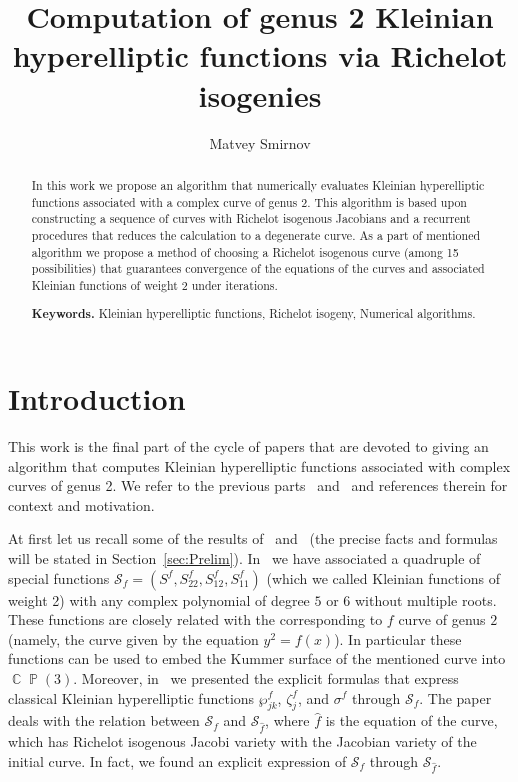 \documentclass{amsart}
\numberwithin{equation}{section}
\theoremstyle{definition}
\theoremstyle{remark}
\DeclareMathOperator{\CC}{\mathbb C}
\DeclareMathOperator{\PP}{\mathbb P}
\begin{document}
	\title[Computation of genus 2 Kleinian hyperelliptic functions]{Computation of genus 2 Kleinian hyperelliptic functions via Richelot isogenies}
	
	\author{Matvey Smirnov}
	\address{119991 Russia, Moscow GSP-1, ul. Gubkina 8,
		Institute for Numerical Mathematics,
		Russian Academy of Sciences}
	
	
	\begin{abstract}
		In this work we propose an algorithm that numerically evaluates Kleinian hyperelliptic functions associated with a complex curve of genus 2. This algorithm is based upon constructing a sequence of curves with Richelot isogenous Jacobians and a recurrent procedures that reduces the calculation to a degenerate curve. As a part of mentioned algorithm we propose a method of choosing a Richelot isogenous curve (among 15 possibilities) that guarantees convergence of the equations of the curves and associated Kleinian functions of weight 2 under iterations.
		
		\smallskip
		\noindent \textbf{Keywords.} Kleinian hyperelliptic functions, Richelot isogeny, Numerical algorithms.
	\end{abstract}
	\maketitle
	
	\section{Introduction}
	This work is the final part of the cycle of papers that are devoted to giving an algorithm that computes Kleinian hyperelliptic functions associated with complex curves of genus 2. We refer to the previous parts~\cite{KleinianWeight2} and~\cite{RichelotExpression} and references therein for context and motivation.
	
	At first let us recall some of the results of~\cite{KleinianWeight2} and~\cite{RichelotExpression} (the precise facts and formulas will be stated in Section~\ref{sec:Prelim}). In~\cite{KleinianWeight2} we have associated a quadruple of special functions $\mathscr S_f = (S^f, S_{22}^f, S_{12}^f, S_{11}^f)$ (which we called Kleinian functions of weight 2) with any complex polynomial of degree $5$ or $6$ without multiple roots. These functions are closely related with the corresponding to $f$ curve of genus $2$ (namely, the curve given by the equation $y^2 = f(x)$). In particular these functions can be used to embed the Kummer surface of the mentioned curve into $\CC\PP(3)$. Moreover, in~\cite{KleinianWeight2} we presented the explicit formulas that express classical Kleinian hyperelliptic functions $\wp_{jk}^f$, $\zeta_{j}^f$, and $\sigma^f$ through $\mathscr S_f$. The paper~\cite{RichelotExpression} deals with the relation between $\mathscr S_f$ and $\mathscr S_{\hat f}$, where $\hat f$ is the equation of the curve, which has Richelot isogenous Jacobi variety with the Jacobian variety of the initial curve. In fact, we found an explicit expression of $\mathscr S_f$ through $\mathscr S_{\hat f}$.
	
\end{document}
